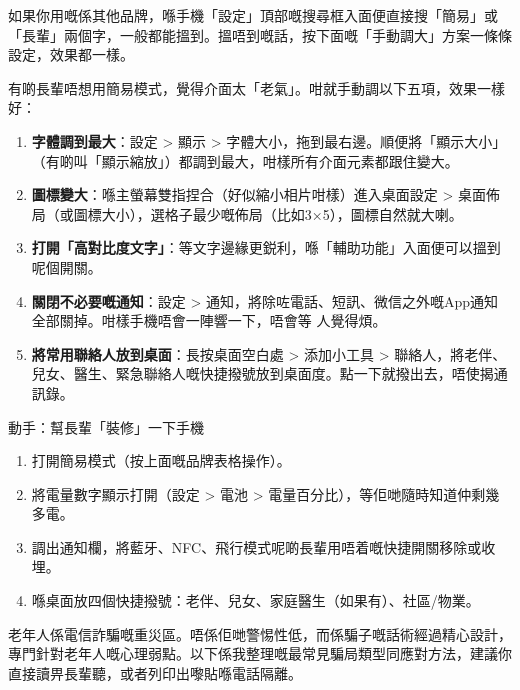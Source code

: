 如果你用嘅係其他品牌，喺手機「設定」頂部嘅搜尋框入面便直接搜「簡易」或「長輩」兩個字，一般都能搵到。搵唔到嘅話，按下面嘅「手動調大」方案一條條設定，效果都一樣。


有啲長輩唔想用簡易模式，覺得介面太「老氣」。咁就手動調以下五項，效果一樣好：

\begin{enumerate}
  \item \textbf{字體調到最大}：設定 > 顯示 > 字體大小，拖到最右邊。順便將「顯示大小」（有啲叫「顯示縮放」）都調到最大，咁樣所有介面元素都跟住變大。
  \item \textbf{圖標變大}：喺主螢幕雙指捏合（好似縮小相片咁樣）進入桌面設定 > 桌面佈局（或圖標大小），選格子最少嘅佈局（比如3×5），圖標自然就大喇。
  \item \textbf{打開「高對比度文字」}：等文字邊緣更鋭利，喺「輔助功能」入面便可以搵到呢個開關。
  \item \textbf{關閉不必要嘅通知}：設定 > 通知，將除咗電話、短訊、微信之外嘅App通知全部關掉。咁樣手機唔會一陣響一下，唔會等 人覺得煩。
  \item \textbf{將常用聯絡人放到桌面}：長按桌面空白處 > 添加小工具 > 聯絡人，將老伴、兒女、醫生、緊急聯絡人嘅快捷撥號放到桌面度。點一下就撥出去，唔使揭通訊錄。
\end{enumerate}

\begin{tcbpractice}{動手：幫長輩「裝修」一下手機}
\begin{enumerate}
  \item 打開簡易模式（按上面嘅品牌表格操作）。
  \item 將電量數字顯示打開（設定 > 電池 > 電量百分比），等佢哋隨時知道仲剩幾多電。
  \item 調出通知欄，將藍牙、NFC、飛行模式呢啲長輩用唔着嘅快捷開關移除或收埋。
  \item 喺桌面放四個快捷撥號：老伴、兒女、家庭醫生（如果有）、社區/物業。
\end{enumerate}

\end{tcbpractice}


老年人係電信詐騙嘅重災區。唔係佢哋警惕性低，而係騙子嘅話術經過精心設計，專門針對老年人嘅心理弱點。以下係我整理嘅最常見騙局類型同應對方法，建議你直接讀畀長輩聽，或者列印出嚟貼喺電話隔離。


